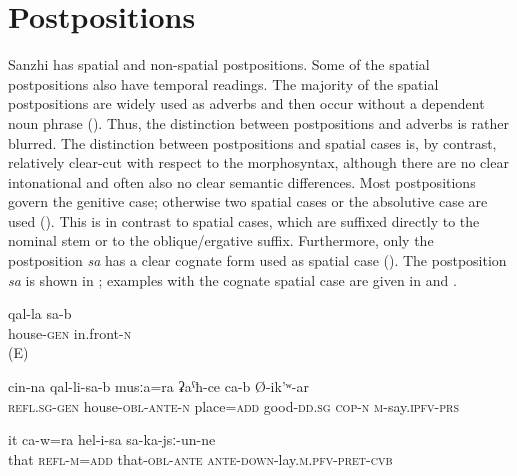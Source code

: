 \chapter{Postpositions}
\label{cpt:postpositions}

Sanzhi has spatial and non-spatial postpositions. Some of the spatial postpositions also have temporal readings. The majority of the spatial postpositions are widely used as adverbs and then occur without a dependent noun phrase (). Thus, the distinction between postpositions and adverbs is rather blurred. The distinction between postpositions and spatial cases is, by contrast, relatively clear-cut with respect to the morphosyntax, although there are no clear intonational and often also no clear semantic differences. Most postpositions govern the genitive case; otherwise two spatial cases or the absolutive case are used (). This is in contrast to spatial cases, which are suffixed directly to the nominal stem or to the oblique/ergative suffix. Furthermore, only the postposition \textit{sa} has a clear cognate form used as spatial case (). The postposition \textit{sa} is shown in ; examples with the cognate spatial case are given in  and . 
%
\begin{exe}
	\ex	
	\begin{xlist}
			\ex	\label{in front of the house}
		\gll	qal-la	sa-b \\
			house-\textsc{gen}	in.front-\textsc{n}\\
		\glt	{} (E)
		
		\ex	\label{In front of his house there is also a good area, he says}
		\gll	cin-na	qal-li-sa-b	musːa=ra	ʡaˁħ-ce	ca-b Ø-ik'ʷ-ar\\
			\textsc{refl}.\textsc{sg}-\textsc{gen}	house-\textsc{obl}-\textsc{ante}-\textsc{n}	place=\textsc{add} good-\textsc{dd}.\textsc{sg} \textsc{cop-n}	\textsc{m}-say.\textsc{ipfv}-\textsc{prs}\\
		\glt	{}

		\ex	\label{he himself also slept in front of it}
		\gll	it	ca-w=ra	hel-i-sa	sa-ka-jsː-un-ne\\
			that	\textsc{refl}-\textsc{m}=\textsc{add}	that-\textsc{obl}-\textsc{ante}	\textsc{ante-down}-lay.\textsc{m}.\textsc{pfv}-\textsc{pret}-\textsc{cvb}\\
		\glt	{}
	\end{xlist}
\end{exe}

